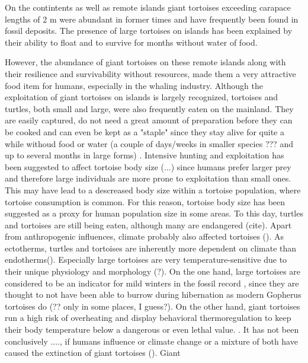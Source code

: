 On the contintents as well as remote islands giant tortoises exceeding carapace lengths of 2 m were abundant in former times and have frequently been found in fossil deposits. The presence of large tortoises on islands has been explained by their ability to float \citep{Gerlach2006, Patterson1973} and to survive for months without water of food. 

However, the abundance of giant tortoises on these remote islands along with their resilience and survivability without resources, made them a very attractive food item for humans, especially in the whaling industry.
Although the exploitation of giant tortoises on islands is largely recognized, tortoises and turtles, both small and large, were also frequently eaten on the mainland.
They are easily captured, do not need a great amount of preparation before they can be cooked and can even be kept as a "staple" since they stay alive for quite a while withoud food or water (a couple of days/weeks in smaller species ??? and up to several months in large forms) \citep{Thompson2002,Thompson2014}. Intensive hunting and exploitation has been suggested to affect tortoise body size (...) since humans prefer larger prey and therefore large individuals are more prone to exploitation than small ones. This may have lead to a descreased body size within a tortoise population, where tortoise consumption is common.
For this reason, tortoise body size has been suggested as a proxy for human population size in some areas\citep{Steele2005,Stiner1999,Stiner2000}.
To this day, turtles and tortoises are still being eaten, although many are endangered (cite).
Apart from anthropogenic influences, climate probably also affected tortoises (). 
As ectotherms, turtles and tortoises are inherently more dependent on climate than endotherms(). Especially large tortoises are very temperature-sensitive due to their unique physiology and morphology (?). On the one hand, large tortoises are considered to be an indicator for mild winters in the fossil record \citep{Hibbard1960}, since they are thought to not have been able to burrow during hibernation as modern Gopherus tortoises do (?? only in some places, I guess?). On the other hand, giant tortoises run a high risk of overheating and display behavioral thermoregulation to keep their body temperature below a dangerous or even lethal value. \citep{Sturbaum1982, Schleich1981}.
It has not been conclusively ...., if humans influence or climate change or a mixture of both have caused the extinction of giant tortoises ().
Giant 

